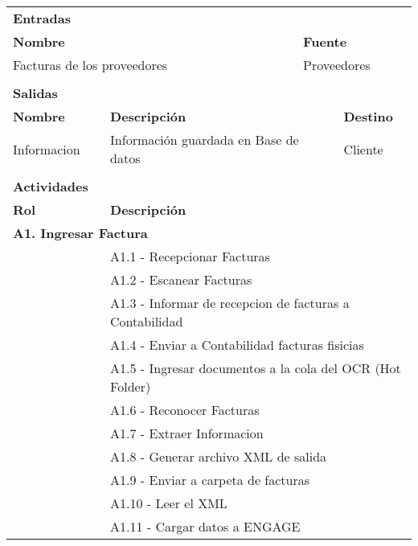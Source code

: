 \begin{longtable}{|llrrrrrr|}
          &       &       &       &       &       &       &  \\ \hline
    \multicolumn{8}{|l|}{\textbf{Entradas}} \\ \hline
    \multicolumn{5}{|l|}{\textbf{Nombre}}   & \multicolumn{3}{|l|}{\textbf{Fuente}} \\ \hline
    \multicolumn{5}{|l|}{Facturas de los proveedores} & \multicolumn{3}{|l|}{Proveedores} \\  \hline
       &       &       &       &       &       &       &  \\ \hline
    \multicolumn{8}{|l|}{\textbf{Salidas}} \\ \hline
    \textbf{Nombre} & \multicolumn{5}{|l|}{\textbf{Descripción}} & \multicolumn{2}{|l|}{\textbf{Destino}} \\ \hline
    Informacion & \multicolumn{5}{|l|}{Información guardada en Base de datos} & \multicolumn{2}{|l|}{Cliente} \\ \hline
       &       &       &       &       &       &       &  \\ \hline
\multicolumn{8}{|l|}{\textbf{Actividades}} \\ \hline
    \textbf{Rol} & \multicolumn{7}{|l|}{\textbf{Descripción}} \\ \hline
    \multicolumn{8}{|l|}{\textbf{A1. Ingresar Factura}} \\ \hline
    & \multicolumn{7}{|l|}{A1.1 -  Recepcionar Facturas} \\ \hline
    & \multicolumn{7}{|l|}{A1.2 -  Escanear Facturas} \\ \hline
    & \multicolumn{7}{|l|}{A1.3 -  Informar de recepcion de facturas a Contabilidad} \\ \hline
    & \multicolumn{7}{|l|}{A1.4 -  Enviar a Contabilidad facturas fisicias} \\ \hline
    & \multicolumn{7}{|l|}{A1.5 -  Ingresar documentos a la cola del OCR (Hot Folder)} \\ \hline
    & \multicolumn{7}{|l|}{A1.6 -  Reconocer Facturas} \\ \hline
    & \multicolumn{7}{|l|}{A1.7 -  Extraer Informacion} \\ \hline
    & \multicolumn{7}{|l|}{A1.8 -  Generar archivo XML de salida} \\ \hline
    & \multicolumn{7}{|l|}{A1.9 -  Enviar a carpeta de facturas} \\ \hline
    & \multicolumn{7}{|l|}{A1.10 - Leer el XML} \\ \hline
    & \multicolumn{7}{|l|}{A1.11 - Cargar datos a ENGAGE} \\ \hline

\end{longtable}
